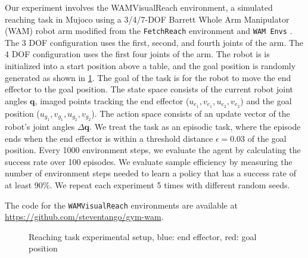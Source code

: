 \documentclass[letterpaper, 10 pt, conference]{ieeeconf}  %
\begin{document}
Our experiment involves the WAMVisualReach environment, a simulated reaching
task in Mujoco \cite{Todorov2012} using a 3/4/7-DOF Barrett Whole Arm
Manipulator (WAM) robot arm modified from the \texttt{FetchReach} environment
\cite{Plappert2018} and \texttt{WAM Envs} \cite{Johnstonbaugh2022}. The 3 DOF
configuration uses the first, second, and fourth joints of the arm. The 4 DOF
configuration uses the first four joints of the arm. The robot is is initialized
into a start position above a table, and the goal position is randomly generated
as shown in \ref{figure_experimental_setup}. The goal of the task is for the
robot to move the end effector to the goal position. The state space consists of
the current robot joint angles $\mathbf{q}$, imaged points tracking the end
effector ($u_{e_1}, v_{e_1}, u_{e_2}, v_{e_2}$) and the goal position ($u_{g_1},
v_{g_1}, u_{g_2}, v_{g_2}$). The action space consists of an update vector of
the robot's joint angles $\Delta \mathbf{q}$. We treat the task as an episodic
task, where the episode ends when the end effector is within a threshold
distance $\epsilon = 0.03$ of the goal position. Every 1000 environment steps,
we evaluate the agent by calculating the success rate over 100 episodes. We
evaluate sample efficiency by measuring the number of environment steps needed
to learn a policy that has a success rate of at least 90\%. We repeat each
experiment 5 times with different random seeds.

The code for the \texttt{WAMVisualReach} environments are available at
\url{https://github.com/steventango/gym-wam}.


\begin{figure}[thpb]
    \centering
    \qquad
    \caption{Reaching task experimental setup, blue: end effector, red: goal position}
    \label{figure_experimental_setup}
\end{figure}
\end{document}
